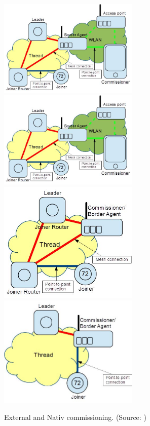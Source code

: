 \begin{figure}[!ht]
    \centering
    \includegraphics[width=67mm, keepaspectratio]{figures/external1-Final_12639Thread_1.3.jpg}\hspace{1cm}
    \includegraphics[width=67mm, keepaspectratio]{figures/external1-Final_12639Thread_1.3.jpg}\\\vspace{5mm}
    \includegraphics[width=67mm, keepaspectratio]{figures/native1-Final_12639Thread_1.3.jpg}\hspace{1cm}
    \includegraphics[width=67mm, keepaspectratio]{figures/native2-Final_12639Thread_1.3.jpg}
    \caption{External and Nativ commissioning. (Source: \cite{thread:130})}
    \label{fig:ot:commissioning}
\end{figure}


